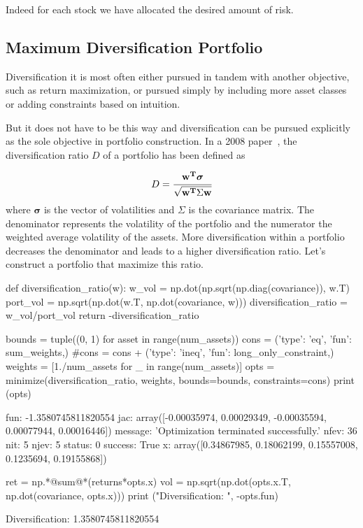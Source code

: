 Indeed for each stock we have allocated the desired amount of risk.


\subsection{Maximum Diversification Portfolio}
\label{maximum-diversification-portfolio}

Diversification it is most often either pursued in tandem with another objective, such as return maximization, or pursued simply by including more asset classes or adding constraints based on intuition.

But it does not have to be this way and diversification can be pursued explicitly as the sole objective in portfolio construction.
In a 2008 paper~\cite{bib:diversification}, the diversification ratio $D$ of a portfolio has been defined as

\begin{equation}
D=\cfrac{\mathbf{w^T}\boldsymbol{\sigma}}{\sqrt {\mathbf{w^T}\Sigma \mathbf{w}}} 
\end{equation}
where $\boldsymbol{\sigma}$ is the vector of volatilities and $\Sigma$ is the covariance matrix. The denominator represents the volatility of the portfolio and the numerator the weighted average volatility of the assets. More diversification within a portfolio decreases the denominator and leads to a higher diversification ratio.
Let's construct a portfolio that maximize this ratio.

\begin{ipython}
	def diversification_ratio(w):
	w_vol = np.dot(np.sqrt(np.diag(covariance)), w.T)
	port_vol = np.sqrt(np.dot(w.T, np.dot(covariance, w)))
	diversification_ratio = w_vol/port_vol
	return -diversification_ratio
	
	bounds = tuple((0, 1) for asset in range(num_assets))
	cons = ({'type': 'eq', 'fun': sum_weights},)
	#cons = cons + ({'type': 'ineq', 'fun': long_only_constraint},)
	weights = [1./num_assets for _ in range(num_assets)]
	opts = minimize(diversification_ratio, weights, bounds=bounds,
	constraints=cons)
	print (opts)
\end{ipython}
\begin{ioutput}
	fun: -1.3580745811820554
	jac: array([-0.00035974,  0.00029349, -0.00035594,  0.00077944,  
	0.00016446])
	message: 'Optimization terminated successfully.'
	nfev: 36
	nit: 5
	njev: 5
	status: 0
	success: True
	x: array([0.34867985, 0.18062199, 0.15557008, 0.1235694, 
	0.19155868])
\end{ioutput}
\begin{ipython}
	ret = np.*@sum@*(returns*opts.x)
	vol = np.sqrt(np.dot(opts.x.T, np.dot(covariance, opts.x)))
	print ("Diversification: ", -opts.fun)
\end{ipython}
\begin{ioutput}
	Diversification: 1.3580745811820554
\end{ioutput}


